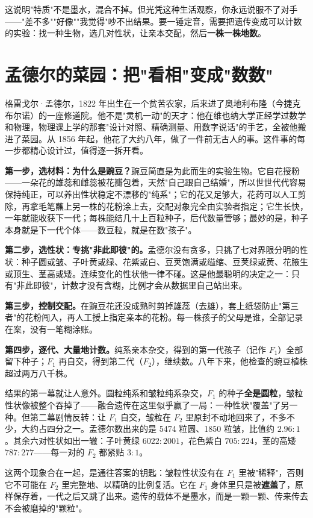 这说明"特质"不是墨水，混合不掉。但光凭这种生活观察，你永远说服不了对手——"差不多""好像""我觉得"吵不出结果。要一锤定音，需要把遗传变成可以计数的实验：找一种生物，选几对性状，让亲本交配，然后\textbf{一株一株地数}。

\section{孟德尔的菜园：把"看相"变成"数数"}

格雷戈尔·孟德尔，1822 年出生在一个贫苦农家，后来进了奥地利布隆（今捷克布尔诺）的一座修道院。他不是"灵机一动"的天才：他在维也纳大学正经学过数学和物理，物理课上学的那套"设计对照、精确测量、用数字说话"的手艺，全被他搬进了菜园。从 1856 年起，他花了大约八年，做了一件前无古人的事。这件事的每一步都精心设计过，值得逐一拆开看。

\textbf{第一步，选材料：为什么是豌豆？}豌豆简直是为此而生的实验生物。它自花授粉——一朵花的雄蕊和雌蕊被花瓣包着，天然"自己跟自己结婚"，所以世世代代容易保持纯正，可以养出性状稳定不漂移的"纯系"；它的花又足够大，花药可以人工剪除，再拿毛笔蘸上另一株的花粉涂上去，交配对象完全由实验者指定；它生长快，一年就能收获下一代；每株能结几十上百粒种子，后代数量管够；最妙的是，种子本身就是下一代个体——数豆粒，就是在数"孩子"。

\textbf{第二步，选性状：专挑"非此即彼"的。}孟德尔没有贪多，只挑了七对界限分明的性状：种子圆或皱、子叶黄或绿、花紫或白、豆荚饱满或缢缩、豆荚绿或黄、花腋生或顶生、茎高或矮。连续变化的性状他一律不碰。这是他最聪明的决定之一：只有"非此即彼"，计数才没有含糊，比例才会从数据里自己站出来。

\textbf{第三步，控制交配。}在豌豆花还没成熟时剪掉雄蕊（去雄），套上纸袋防止"第三者"的花粉闯入，再人工授上指定亲本的花粉。每一株孩子的父母是谁，全部记录在案，没有一笔糊涂账。

\textbf{第四步，逐代、大量地计数。}纯系亲本杂交，得到的第一代孩子（记作 $F_1$）全部留下种子；$F_1$ 再自交，得到第二代（$F_2$），继续数。八年下来，他检查的豌豆植株超过两万八千株。

结果的第一幕就让人意外。圆粒纯系和皱粒纯系杂交，$F_1$ 的种子\textbf{全是圆粒}，皱粒性状像被整个吞掉了——融合遗传在这里似乎赢了一局：一种性状"覆盖"了另一种。但第二幕剧情反转：让 $F_1$ 自交，皱粒在 $F_2$ 里原封不动地回来了，不多不少，大约占四分之一。孟德尔数出来的是 5474 粒圆、1850 粒皱，比值约 $2.96:1$。其余六对性状如出一辙：子叶黄绿 $6022:2001$，花色紫白 $705:224$，茎的高矮 $787:277$——每一对的 $F_2$ 都紧贴 $3:1$。

这两个现象合在一起，是通往答案的钥匙：皱粒性状没有在 $F_1$ 里被"稀释"，否则它不可能在 $F_2$ 里完整地、以精确的比例复活。它在 $F_1$ 身体里只是被\textbf{遮盖}了，原样保存着，一代之后又跳了出来。遗传的载体不是墨水，而是一颗一颗、传来传去不会被磨掉的"颗粒"。

